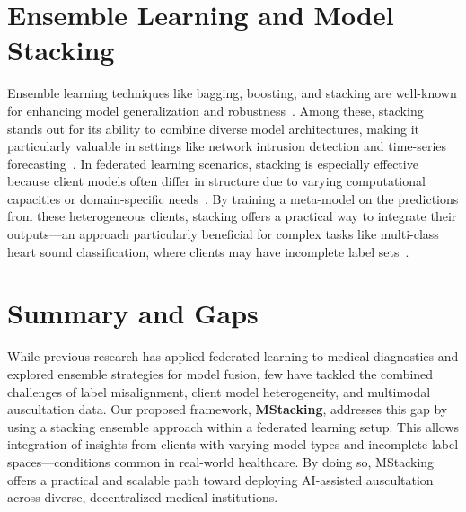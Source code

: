 \section{Ensemble Learning and Model Stacking}
Ensemble learning techniques like bagging, boosting, and stacking are well-known for enhancing model generalization and robustness~\cite{buhlmann2012ensemble, ribeiro2020ensemble}. Among these, stacking stands out for its ability to combine diverse model architectures, making it particularly valuable in settings like network intrusion detection\cite{zhang2021multi,rajagopal2020stacking} and time-series forecasting~\cite{ribeiro2020ensemble}. In federated learning scenarios, stacking is especially effective because client models often differ in structure due to varying computational capacities or domain-specific needs~\cite{lin2020ensemble}. By training a meta-model on the predictions from these heterogeneous clients, stacking offers a practical way to integrate their outputs—an approach particularly beneficial for complex tasks like multi-class heart sound classification, where clients may have incomplete label sets~\cite{liu2024cybersecurity}.

\section{Summary and Gaps}
While previous research has applied federated learning to medical diagnostics and explored ensemble strategies for model fusion, few have tackled the combined challenges of label misalignment, client model heterogeneity, and multimodal auscultation data. Our proposed framework, \textbf{MStacking}, addresses this gap by using a stacking ensemble approach within a federated learning setup. This allows integration of insights from clients with varying model types and incomplete label spaces—conditions common in real-world healthcare. By doing so, MStacking offers a practical and scalable path toward deploying AI-assisted auscultation across diverse, decentralized medical institutions.

% 